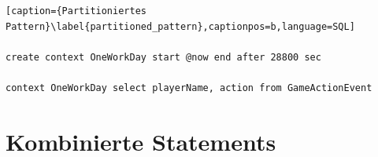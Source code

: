 \begin{lstlisting}[caption={Partitioniertes Pattern}\label{partitioned_pattern},captionpos=b,language=SQL]

create context OneWorkDay start @now end after 28800 sec

context OneWorkDay select playerName, action from GameActionEvent

\end{lstlisting}

\section{Kombinierte Statements}


